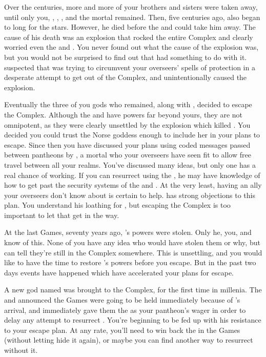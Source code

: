 \documentclass[char]{guardians}
\begin{document}
Over the centuries, more and more of your brothers and sisters were taken away, until only you, \cOsiris{}, \cAnubis{}, \cSet{}, and the mortal \cEgyptianHuman{} remained. Then, five centuries ago, \cSet{} also began to long for the stars. However, he died before the \cWarden{} and \cCaretaker{} could take him away. The cause of his death was an explosion that rocked the entire Complex and clearly worried even the \cWarden{} and \cCaretaker{}. You never found out what the cause of the explosion was, but you would not be surprised to find out that \cOsiris{} had something to do with it. \cAnubis{} suspected that \cSet{} was trying to circumvent your overseers' spells of protection in a desperate attempt to get out of the Complex, and unintentionally caused the explosion.

Eventually the three of you gods who remained, along with \cEgyptianHuman{}, decided to escape the Complex. Although the \cWarden{} and \cCaretaker{} have powers far beyond yours, they are not omnipotent, as they were clearly unsettled by the explosion which killed \cSet{}. You decided you could trust the Norse goddess \cHel{} enough to include her in your plans to escape. Since then you have discussed your plans using coded messages passed between pantheons by \cJascha{}, a mortal who your overseers have seen fit to allow free travel between all your realms. You've discussed many ideas, but only one has a real chance of working. If you can resurrect \cSet{} using the \iNecro{\MYname}, he may have knowledge of how to get past the security systems of the \cWarden{} and \cCaretaker{}. At the very least, having an ally your overseers don't know about is certain to help. \cOsiris{} has strong objections to this plan. You understand his loathing for \cSet{}, but escaping the Complex is too important to let that get in the way.


At the last Games, seventy years ago, \cOsiris{}'s powers were stolen. Only he, you, and \cAnubis{} know of this. None of you have any idea who would have stolen them or why, but \cOsiris{} can tell they're still in the Complex somewhere. This is unsettling, and you would like to have the time to restore \cOsiris{}'s powers before you escape. But in the past two days events have happened which have accelerated your plans for escape.

A new god named \cUnity{} was brought to the Complex, for the first time in millenia. The \cWarden{} and \cCaretaker{} announced the Games were going to be held immediately because of \cUnity{}'s arrival, and \cOsiris{} immediately gave them the \iNecro{\MYname} as your pantheon's wager in order to delay any attempt to resurrect \cSet{}. You're beginning to be fed up with his resistance to your escape plan. At any rate, you'll need to win back the \iNecro{\MYname} in the Games (without letting \cOsiris{} hide it again), or maybe you can find another way to resurrect \cSet{} without it.
\end{document}
